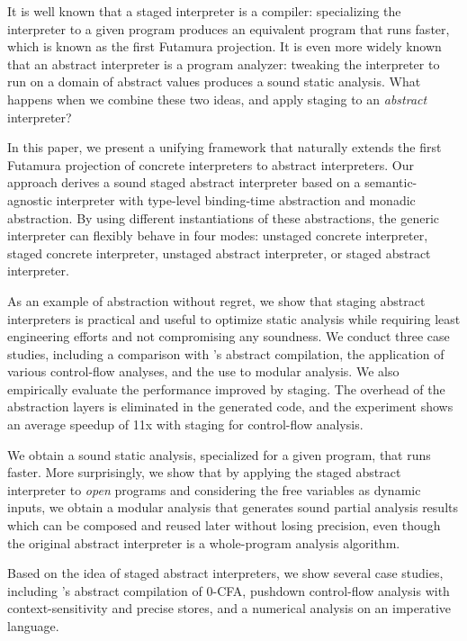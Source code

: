 It is well known that a staged interpreter is a compiler: specializing the
interpreter to a given program produces an equivalent program that runs faster,
which is known as the first Futamura projection. It is even more widely known that an
abstract interpreter is a program analyzer: tweaking the interpreter to run on a
domain of abstract values produces a sound static analysis. What happens when we
combine these two ideas, and apply staging to an \emph{abstract} interpreter?

In this paper, we present a unifying framework that naturally extends the first
Futamura projection of concrete interpreters to abstract interpreters. Our
approach derives a sound staged abstract interpreter based on a
semantic-agnostic interpreter with type-level binding-time abstraction and
monadic abstraction. By using different instantiations of these abstractions,
the generic interpreter can flexibly behave in four modes: unstaged concrete
interpreter, staged concrete interpreter, unstaged abstract interpreter, or
staged abstract interpreter.

As an example of abstraction without regret, we show that staging abstract
interpreters is practical and useful to optimize static analysis while requiring
least engineering efforts and not compromising any soundness. We conduct three
case studies, including a comparison with
\citeauthor{Boucher:1996:ACN:647473.727587}'s abstract compilation,
the application of various control-flow analyses, and the use to modular
analysis. We also empirically evaluate the performance improved by staging. The
overhead of the abstraction layers is eliminated in the generated code, and the 
experiment shows an average speedup of 11x with staging for control-flow analysis.

\iffalse
We obtain a sound static analysis, specialized for
a given program, that runs faster. More surprisingly, we show that by applying
the staged abstract interpreter to \textit{open} programs and considering the
free variables as dynamic inputs, we obtain a modular analysis that generates
sound partial analysis results which can be composed and reused later without
losing precision, even though the original abstract interpreter is a
whole-program analysis algorithm.

Based on the idea of staged abstract interpreters, we show several case studies,
including \citeauthor{Boucher:1996:ACN:647473.727587}'s abstract compilation of
0-CFA, pushdown control-flow analysis with context-sensitivity and precise
stores, and a numerical analysis on an imperative language.

